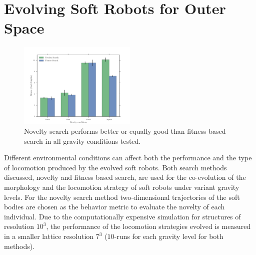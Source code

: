 \documentclass{sig-alternate}
\begin{document}
\section{Evolving Soft Robots for Outer Space} 

\begin{figure}[b!]
\centering
\includegraphics[width=0.5\textwidth]{../Figures/Results/GravityExperiment.pdf}
\caption{Novelty search performs better or equally good than fitness based search in all gravity conditions tested.}
\label{fig:gravityConditions}
\end{figure}


Different environmental conditions can affect both the performance and the type of locomotion produced by the evolved soft robots. Both search methods discussed, novelty and fitness based search, are used for the co-evolution of the morphology and the locomotion strategy of soft robots under variant gravity levels. For the novelty search method two-dimensional trajectories of the soft bodies are chosen as the behavior metric to evaluate the novelty of each individual. Due to the computationally expensive simulation for structures of resolution $10^3$, the performance of the locomotion strategies evolved is measured in a smaller lattice resolution $7^3$ ($10$-runs for each gravity level for both methods).
\end{document}
